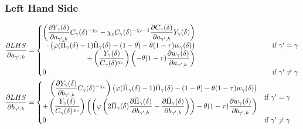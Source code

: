 \documentclass[11pt]{article}
\begin{document}
\subsubsection*{Left Hand Side}
\begin{align}
\frac{\partial LHS}{\partial a_{\gamma',k}} &=
\begin{cases}
\begin{aligned}
\left(\frac{\partial Y_{\gamma}(\delta)}{\partial a_{\gamma',k}}C_{\gamma}(\delta)^{-\chi_c} - \chi_cC_{\gamma}(\delta)^{-\chi_c - 1}\frac{\partial C_{\gamma}(\delta)}{\partial a_{\gamma',k}}Y_{\gamma}(\delta)\right) \\
\cdot \left(\varphi (\tilde{\Pi}_{\gamma}(\delta) - 1)\tilde{\Pi}_{\gamma}(\delta) - (1 - \theta) - \theta (1-\tau)w_{\gamma}(\delta)\right)\\
 + \left(\frac{Y_{\gamma}(\delta)}{C_{\gamma}(\delta)^{\chi_{c}}}\right)\left(- \theta (1-\tau)\frac{\partial w_{\gamma}(\delta)}{\partial a_{\gamma',k}}\right)
\end{aligned} & \hspace{3.5cm}\text{if } \gamma' = \gamma \\
0 & \hspace{3.5cm}\text{if } \gamma' \neq \gamma
\end{cases}\\
\frac{\partial LHS}{\partial b_{\gamma',k}} &=
\begin{cases}
\begin{aligned}
 \left(\frac{\partial Y_{\gamma}(\delta)}{\partial b_{\gamma',k}}C_{\gamma}(\delta)^{-\chi_c}\right)\left(\varphi (\tilde{\Pi}_{\gamma}(\delta) - 1)\tilde{\Pi}_{\gamma}(\delta) - (1 - \theta) - \theta (1-\tau)w_{\gamma}(\delta)\right) \\
 + \left(\frac{Y_{\gamma}(\delta)}{C_{\gamma}(\delta)^{\chi_{c}}}\right)\left(\left(\varphi\left(2\tilde{\Pi}_{\gamma}(\delta)\frac{\partial \tilde{\Pi}_{\gamma}(\delta)}{\partial b_{\gamma',k}} - \frac{\partial \tilde{\Pi}_{\gamma}(\delta)}{\partial b_{\gamma',k}}\right)\right) - \theta (1-\tau)\frac{\partial w_{\gamma}(\delta)}{\partial b_{\gamma',k}}\right)
\end{aligned}& \text{if } \gamma' = \gamma \\
0 & \text{if } \gamma' \neq \gamma
\end{cases}
\end{align}
\end{document}
